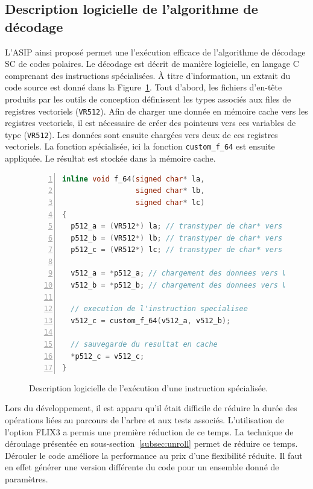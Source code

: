 \subsection{Description logicielle de l'algorithme de décodage}
L'ASIP ainsi proposé permet une l'exécution efficace de l'algorithme de décodage SC de codes polaires. Le décodage est décrit de manière logicielle, en langage C comprenant des instructions spécialisées. \`A titre d'information, un extrait du code source est donné dans la Figure~\ref{fig:f_code}. Tout d'abord, les fichiers d'en-tête produits par les outils de conception définissent les types associés aux files de registres vectoriels (\texttt{VR512}). Afin de charger une donnée en mémoire cache vers les registres vectoriels, il est nécessaire de créer des pointeurs vers ces variables de type (\texttt{VR512}). Les données sont ensuite chargées vers deux de ces registres vectoriels. La fonction spécialisée, ici la fonction \texttt{custom\_f\_64} est ensuite appliquée. Le résultat est stockée dans la mémoire cache.
\begin{figure}[hb]
\begin{lstlisting}[language=C++, numbers=left, numbersep=0.3em, tabsize=2, basicstyle=\footnotesize\ttfamily]
inline void f_64(signed char* la, 
                 signed char* lb, 
                 signed char* lc)
{
  p512_a = (VR512*) la; // transtyper de char* vers VR512
  p512_b = (VR512*) lb; // transtyper de char* vers VR512
  p512_c = (VR512*) lc; // transtyper de char* vers VR512

  v512_a = *p512_a; // chargement des donnees vers VR512
  v512_b = *p512_b; // chargement des donnees vers VR512
  
  // execution de l'instruction specialisee
  v512_c = custom_f_64(v512_a, v512_b); 
  
  // sauvegarde du resultat en cache
  *p512_c = v512_c;     
}
\end{lstlisting}
\caption{Description logicielle de l'exécution d'une instruction spécialisée.}
\label{fig:f_code}
\end{figure}
Lors du développement, il est apparu qu'il était difficile de réduire la durée des opérations liées au parcours de l'arbre et aux tests associés. L'utilisation de l'option FLIX3 a permis une première réduction de ce temps. La technique de déroulage présentée en sous-section~\ref{subsec:unroll} permet de réduire ce temps. Dérouler le code améliore la performance au prix d'une flexibilité réduite. Il faut en effet générer une version différente du code pour un ensemble donné de paramètres.


